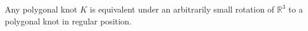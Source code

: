 Any polygonal knot $K$ is equivalent under an arbitrarily small rotation of $\mathbb{R}^3$ to a polygonal knot in regular position.
